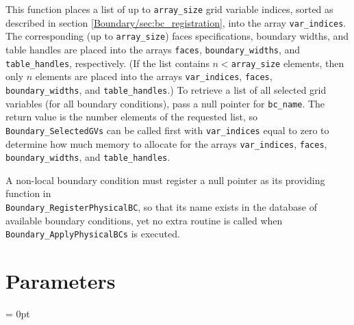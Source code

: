 \documentclass{article}
\newlength{\tableWidth} \newlength{\maxVarWidth} \newlength{\paraWidth} \newlength{\descWidth}
\begin{document}
This function places a list of up to \texttt{array\_size} grid
variable indices, sorted as described in section
\ref{Boundary/sec:bc_registration}, into the array \texttt{var\_indices}.  The
corresponding (up to \texttt{array\_size}) faces specifications,
boundary widths, and table handles are placed into the arrays
\texttt{faces}, \texttt{boundary\_widths}, and
\texttt{table\_handles}, respectively.  (If the list contains
$n<$\texttt{array\_size} elements, then only $n$ elements are placed
into the arrays \texttt{var\_indices}, \texttt{faces},
\texttt{boundary\_widths}, and \texttt{table\_handles}.)  To retrieve
a list of all selected grid variables (for all boundary conditions),
pass a null pointer for \texttt{bc\_name}.  The return value is the
number elements of the requested list, so
\texttt{Boundary\_SelectedGVs} can be called first with
\texttt{var\_indices} equal to zero to determine how much memory to
allocate for the arrays \texttt{var\_indices}, \texttt{faces},
\texttt{boundary\_widths}, and \texttt{table\_handles}.

A non-local boundary condition must register a null pointer as its
providing function in\\ \texttt{Boundary\_RegisterPhysicalBC}, so that
its name exists in the database of available boundary conditions, yet
no extra routine is called when \texttt{Boundary\_ApplyPhysicalBCs} is
executed.




\section{Parameters} 


\parskip = 0pt

\setlength{\tableWidth}{160mm}

\setlength{\paraWidth}{\tableWidth}
\setlength{\descWidth}{\tableWidth}
\settowidth{\maxVarWidth}{register\_radiation}

\addtolength{\paraWidth}{-\maxVarWidth}
\addtolength{\paraWidth}{-\columnsep}
\addtolength{\paraWidth}{-\columnsep}
\addtolength{\paraWidth}{-\columnsep}
\end{document}
